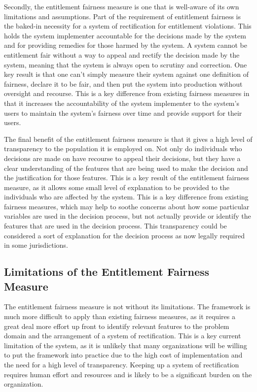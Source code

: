 Secondly, the entitlement fairness measure is one that is well-aware of its own
limitations and assumptions. Part of the requirement of entitlement fairness is
the baked-in necessity for a system of rectification for entitlement violations.
This holds the system implementer accountable for the decisions made by the
system and for providing remedies for those harmed by the system. A system
cannot be entitlement fair without a way to appeal and rectify the decision made
by the system, meaning that the system is always open to scrutiny and
correction. One key result is that one can't simply measure their system against
one definition of fairness, declare it to be fair, and then put the system into
production without oversight and recourse. This is a key difference from 
existing fairness measures in that it increases the accountability of the system
implementer to the system's users to maintain the system's fairness over time
and provide support for their users. 

The final benefit of the entitlement fairness measure is that it gives a high
level of transparency to the population it is employed on. Not only do
individuals who decisions are made on have recourse to appeal their decisions, 
but they have a clear understanding of the features that are being used to make
the decision and the justification for those features. This is a key 
result of the entitlement fairness measure, as it allows some small level of
explanation to be provided to the individuals who are affected by the system.
This is a key difference from existing fairness measures, which may help to
soothe concerns about how some particular variables are used in the decision 
process, but not actually provide or identify the features that are used in the
decision process. This transparency could be considered a sort of explanation
for the decision process as now legally required in some jurisdictions.

\subsection{Limitations of the Entitlement Fairness Measure}

The entitlement fairness measure is not without its limitations. The framework
is much more difficult to apply than existing fairness measures, as it requires
a great deal more effort up front to identify relevant features to the
problem domain and the arrangement of a system of rectification. This is a key
current limitation of the system, as it is unlikely that many organizations
will be willing to put the framework into practice due to the high cost of
implementation and the need for a high level of transparency. Keeping up a
system of rectification requires human effort and resources and is likely to
be a significant burden on the organization.

